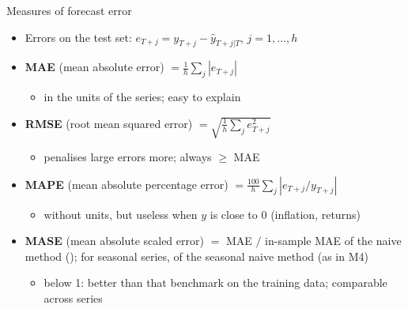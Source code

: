 \begin{frame}{Measures of forecast error}
\itemsize{\footnotesize}
\begin{itemize}
    \item Errors on the test set: $e_{T+j} = y_{T+j} - \hat y_{T+j|T}$, $j = 1, \ldots, h$
    \item \textbf{MAE} (mean absolute error) $= \frac1h \sum_j |e_{T+j}|$
    \begin{itemize}
        \item in the units of the series; easy to explain
    \end{itemize}
    \item \textbf{RMSE} (root mean squared error) $= \sqrt{\frac1h \sum_j e_{T+j}^2}$
    \begin{itemize}
        \item penalises large errors more; always $\ge$ MAE
    \end{itemize}
    \item \textbf{MAPE} (mean absolute percentage error) $= \frac{100}{h} \sum_j |e_{T+j} / y_{T+j}|$
    \begin{itemize}
        \item without units, but useless when $y$ is close to 0 (inflation, returns)
    \end{itemize}
    \item \textbf{MASE} (mean absolute scaled error) $=$ MAE $/$ in-sample MAE of the naive method (); for seasonal series, of the seasonal naive method (as in M4)
    \begin{itemize}
        \item below 1: better than that benchmark on the training data; comparable across series
    \end{itemize}
\end{itemize}
\end{frame}

